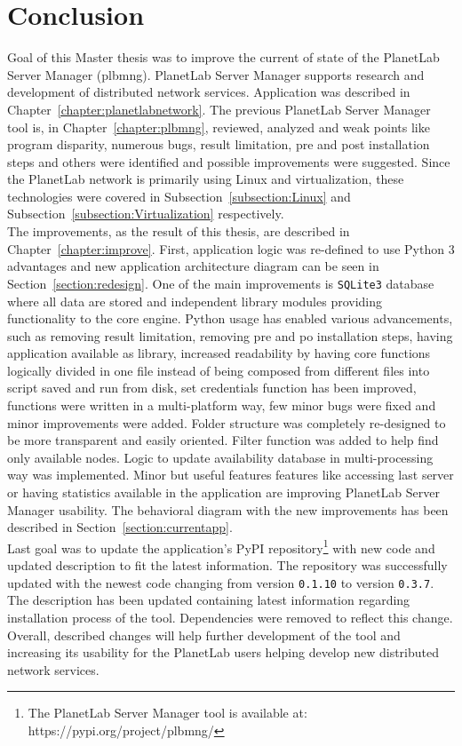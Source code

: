 \chapter{Conclusion}
Goal of this Master thesis was to improve the current of state of the PlanetLab Server Manager (plbmng). PlanetLab Server Manager supports research and development of distributed network services. Application was described in Chapter~\ref{chapter:planetlabnetwork}. The previous PlanetLab Server Manager tool is, in Chapter~\ref{chapter:plbmng}, reviewed, analyzed and weak points like program disparity, numerous bugs, result limitation, pre and post installation steps and others were identified and possible improvements were suggested. Since the PlanetLab network is primarily using Linux and virtualization, these technologies were covered in Subsection~\ref{subsection:Linux} and Subsection~\ref{subsection:Virtualization} respectively.\\
The improvements, as the result of this thesis, are described in Chapter~\ref{chapter:improve}. First, application logic was re-defined to use Python 3 advantages and new application architecture diagram can be seen in Section~\ref{section:redesign}. One of the main improvements is \texttt{SQLite3} database where all data are stored and independent library modules providing functionality to the core engine. Python usage has enabled various advancements, such as removing result limitation, removing pre and po installation steps, having application available as library, increased readability by having core functions logically divided in one file instead of being composed from different files into script saved and run from disk, set credentials function has been improved, functions were written in a multi-platform way, few minor bugs were fixed and minor improvements were added. Folder structure was completely re-designed to be more transparent and easily oriented. Filter function was added to help find only available nodes. Logic to update availability database in multi-processing way was implemented. Minor but useful features features like accessing last server or having statistics available in the application are improving PlanetLab Server Manager usability. The behavioral diagram with the new improvements has been described in Section~\ref{section:currentapp}.\\
Last goal was to update the application's PyPI repository\footnote{The PlanetLab Server Manager tool is available at: https://pypi.org/project/plbmng/} with new code and updated description to fit the latest information. The repository was successfully updated with the newest code changing from version \texttt{0.1.10} to version \texttt{0.3.7}. The description has been updated containing latest information regarding installation process of the tool. Dependencies were removed to reflect this change. Overall, described changes will help further development of the tool and increasing its usability for the PlanetLab users helping develop new distributed network services. 